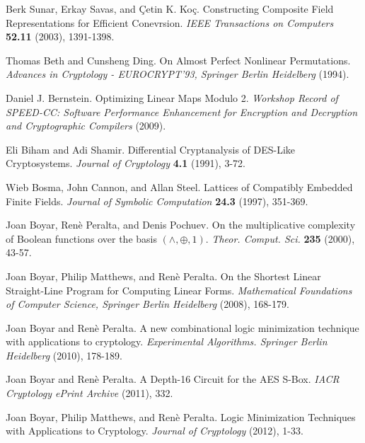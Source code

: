 \documentclass[11pt,american]{report}
\begin{document}

% 
\begin{thebibliography}{9}


 Berk Sunar, Erkay Savas, and \c{C}etin K. Ko\c{c}. Constructing Composite Field Representations for Efficient Conevrsion. \emph{IEEE Transactions on Computers} \textbf{52.11} (2003), 1391-1398.

 Thomas Beth and Cunsheng Ding. On Almost Perfect Nonlinear Permutations. \emph{Advances in Cryptology - EUROCRYPT’93, Springer Berlin Heidelberg} (1994).

 Daniel J. Bernstein. Optimizing Linear Maps Modulo 2. \emph{Workshop Record of SPEED-CC: Software Performance Enhancement for Encryption and Decryption and Cryptographic Compilers} (2009).

 Eli Biham and Adi Shamir. Differential Cryptanalysis of DES-Like Cryptosystems. \emph{Journal of Cryptology} \textbf{4.1} (1991), 3-72.

 Wieb Bosma, John Cannon, and Allan Steel. Lattices of Compatibly Embedded Finite Fields. \emph{Journal of Symbolic Computation} \textbf{24.3} (1997), 351-369.

 Joan Boyar, Ren\`{e} Peralta, and Denis Pochuev. On the multiplicative complexity of Boolean functions over the basis $(\land, \oplus, 1)$. \emph{Theor. Comput. Sci.} \textbf{235} (2000), 43-57.

 Joan Boyar, Philip Matthews, and Ren\`{e} Peralta. On the Shortest Linear Straight-Line Program for Computing Linear Forms. \emph{Mathematical Foundations of Computer Science, Springer Berlin Heidelberg} (2008), 168-179.

 Joan Boyar and Ren\`{e} Peralta. A new combinational logic minimization technique with applications to cryptology. \emph{Experimental Algorithms. Springer Berlin Heidelberg} (2010), 178-189.

 Joan Boyar and Ren\`{e} Peralta. A Depth-16 Circuit for the AES S-Box. \emph{IACR Cryptology ePrint Archive} (2011), 332.

 Joan Boyar, Philip Matthews, and Ren\`{e} Peralta. Logic Minimization Techniques with Applications to Cryptology. \emph{Journal of Cryptology} (2012), 1-33.


\end{thebibliography}
\end{document}

